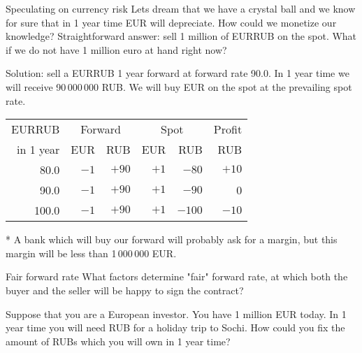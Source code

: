 \documentclass{beamer}
\begin{document}
\begin{frame}{Speculating on currency risk}
\justify
Lets dream that we have a crystal ball and we know for sure that in 1 year time EUR will depreciate. How could we monetize our knowledge? Straightforward answer: sell 1 million of EURRUB on the spot. What if we do not have 1 million euro at hand right now?

\justify
Solution: sell a EURRUB 1 year forward at forward rate 90.0. In 1 year time we will receive 90\,000\,000 RUB. We will buy EUR on the spot at the prevailing spot rate.

\justify
\centering
\begin{tabular}{r|r|r|r|r|r}
EURRUB      & \multicolumn{2}{c|}{Forward} & \multicolumn{2}{c|}{Spot} & Profit \\
\cline{2-5}
in 1 year & EUR     & RUB     & EUR     & RUB      & RUB \\ \hline
80.0      & $-1$ & $+90$  & $+1$ & $-80$ & $+10$ \\
90.0      & $-1$ & $+90$  & $+1$ & $-90$ & 0 \\
100.0     & $-1$& $+90$  & $+1$ & $-100$ & $-10$ \\
\end{tabular}
 
\justify
* A bank which will buy our forward will probably ask for a margin, but this margin will be less than 1\,000\,000 EUR.
\end{frame}



\begin{frame}{Fair forward rate}
\justify
What factors determine "fair" forward rate, at which both the buyer and the seller will be happy to sign the contract? 

\justify
Suppose that you are a European investor. You have 1 million EUR today. In 1 year time you will need RUB for a holiday trip to Sochi. How could you fix the amount of RUBs which you will own in 1 year time?
\end{frame}
\end{document}
